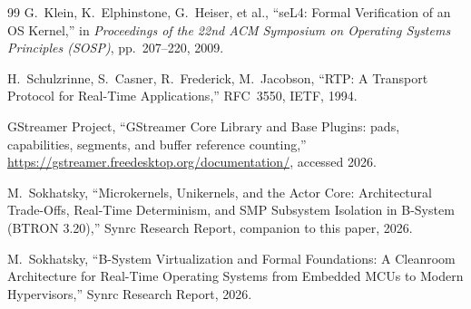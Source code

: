 \documentclass[10pt,journal,compsoc,twocolumn]{article}
\theoremstyle{definition}
\theoremstyle{remark}
\theoremstyle{plain}
\begin{document}
\begin{thebibliography}{99}
G.~Klein, K.~Elphinstone, G.~Heiser, et al., ``seL4: Formal Verification of an OS Kernel,'' in \emph{Proceedings of the 22nd ACM Symposium on Operating Systems Principles (SOSP)}, pp.~207--220, 2009.

H.~Schulzrinne, S.~Casner, R.~Frederick, M.~Jacobson, ``RTP: A Transport Protocol for Real-Time Applications,'' RFC~3550, IETF, 1994.

GStreamer Project, ``GStreamer Core Library and Base Plugins: pads, capabilities, segments, and buffer reference counting,'' \url{https://gstreamer.freedesktop.org/documentation/}, accessed 2026.

M.~Sokhatsky, ``Microkernels, Unikernels, and the Actor Core: Architectural Trade-Offs, Real-Time Determinism, and SMP Subsystem Isolation in B-System (BTRON 3.20),'' Synrc Research Report, companion to this paper, 2026.

M.~Sokhatsky, ``B-System Virtualization and Formal Foundations: A Cleanroom Architecture for Real-Time Operating Systems from Embedded MCUs to Modern Hypervisors,'' Synrc Research Report, 2026.

\end{thebibliography}
\end{document}
